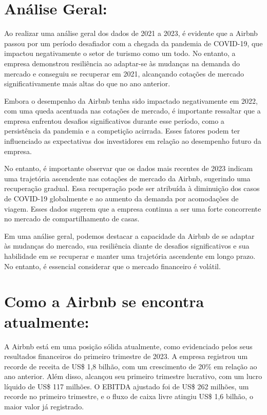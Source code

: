 \documentclass{article}
\begin{document}
    \section*{Análise Geral:}

Ao realizar uma análise geral dos dados de 2021 a 2023, é evidente que a Airbnb passou por um período desafiador com a chegada da pandemia de COVID-19, que impactou negativamente o setor de turismo como um todo. No entanto, a empresa demonstrou resiliência ao adaptar-se às mudanças na demanda do mercado e conseguiu se recuperar em 2021, alcançando cotações de mercado significativamente mais altas do que no ano anterior.

Embora o desempenho da Airbnb tenha sido impactado negativamente em 2022, com uma queda acentuada nas cotações de mercado, é importante ressaltar que a empresa enfrentou desafios significativos durante esse período, como a persistência da pandemia e a competição acirrada. Esses fatores podem ter influenciado as expectativas dos investidores em relação ao desempenho futuro da empresa.

No entanto, é importante observar que os dados mais recentes de 2023 indicam uma trajetória ascendente nas cotações de mercado da Airbnb, sugerindo uma recuperação gradual. Essa recuperação pode ser atribuída à diminuição dos casos de COVID-19 globalmente e ao aumento da demanda por acomodações de viagem. Esses dados sugerem que a empresa continua a ser uma forte concorrente no mercado de compartilhamento de casas.

Em uma análise geral, podemos destacar a capacidade da Airbnb de se adaptar às mudanças do mercado, sua resiliência diante de desafios significativos e sua habilidade em se recuperar e manter uma trajetória ascendente em longo prazo. No entanto, é essencial considerar que o mercado financeiro é volátil.

    \section*{Como a Airbnb se encontra atualmente:}
A Airbnb está em uma posição sólida atualmente, como evidenciado pelos seus resultados financeiros do primeiro trimestre de 2023. A empresa registrou um recorde de receita de US\$ 1,8 bilhão, com um crescimento de 20\% em relação ao ano anterior. Além disso, alcançou seu primeiro trimestre lucrativo, com um lucro líquido de US\$ 117 milhões. O EBITDA ajustado foi de US\$ 262 milhões, um recorde no primeiro trimestre, e o fluxo de caixa livre atingiu US\$ 1,6 bilhão, o maior valor já registrado.
\end{document}
